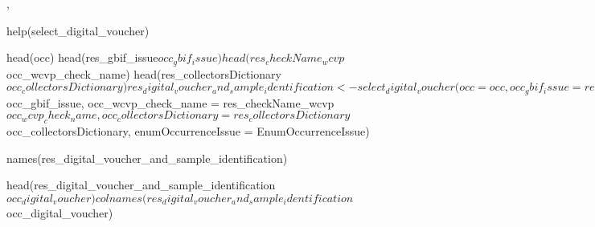 \documentclass[a4paper]{book}
\begin{document}
%
\begin{SeeAlso}
, 
\end{SeeAlso}
%
\begin{Examples}
\begin{ExampleCode}

help(select_digital_voucher)

head(occ)
head(res_gbif_issue$occ_gbif_issue)
head(res_checkName_wcvp$occ_wcvp_check_name)
head(res_collectorsDictionary$occ_collectorsDictionary)
res_digital_voucher_and_sample_identification <- select_digital_voucher(occ = occ,
                                                                        occ_gbif_issue = res_gbif_issue$occ_gbif_issue,
                                                                        occ_wcvp_check_name = res_checkName_wcvp$occ_wcvp_check_name,
                                                                        occ_collectorsDictionary = res_collectorsDictionary$occ_collectorsDictionary,
                                                                        enumOccurrenceIssue = EnumOccurrenceIssue)

names(res_digital_voucher_and_sample_identification)

head(res_digital_voucher_and_sample_identification$occ_digital_voucher)
colnames(res_digital_voucher_and_sample_identification$occ_digital_voucher)


\end{ExampleCode}
\end{Examples}
%
\end{document}
